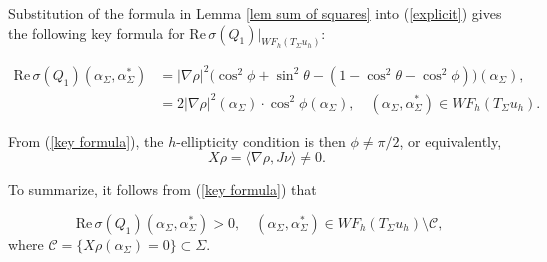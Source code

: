 \documentclass[11pt,reqno]{amsart}
\renewcommand{\Re} {\mathrm{Re\,}}
\newtheorem{lemma}[theorem]{Lemma}
\theoremstyle{definition}
\begin{document}
   
Substitution of the formula in Lemma \ref{lem sum of squares} into (\ref{explicit}) gives the following key formula for $\Re \sigma(Q_{1}) |_{ WF_{h}(T_{\Sigma} u_h)}:$

\begin{eqnarray} \label{key formula}
\Re \sigma(Q_{1})(\alpha_\Sigma,\alpha_\Sigma^*) &= |\nabla \rho|^2 \big( \cos^2 \phi + \sin^2\theta - (1- \cos^2 \theta - \cos^2 \phi) \big)(\alpha_\Sigma), \nonumber \\
&= 2 |\nabla \rho|^2(\alpha_\Sigma) \cdot \cos^2\phi(\alpha_\Sigma), \quad  (\alpha_\Sigma, \alpha_\Sigma^*)  \in WF_h(T_\Sigma u_h).
\end{eqnarray}



From (\ref{key formula}), the $h$-ellipticity condition is then $\phi\neq \pi/2$, or equivalently,
\begin{equation}\label{nzero}
  \quad X \rho = \langle \nabla\rho,J\nu\rangle \neq 0.
\end{equation}

To summarize, it follows from (\ref{key formula}) that

\begin{equation} \label{ellipticity}
\Re \sigma(Q_1)(\alpha_\Sigma,\alpha_\Sigma^*) >0, \quad (\alpha_\Sigma,\alpha_\Sigma^*) \in WF_h(T_\Sigma u_h) \setminus {\mathcal C},
\end{equation}
where ${\mathcal C} = \{ X\rho(\alpha_\Sigma) = 0 \} \subset \Sigma.$




 


\end{document}
